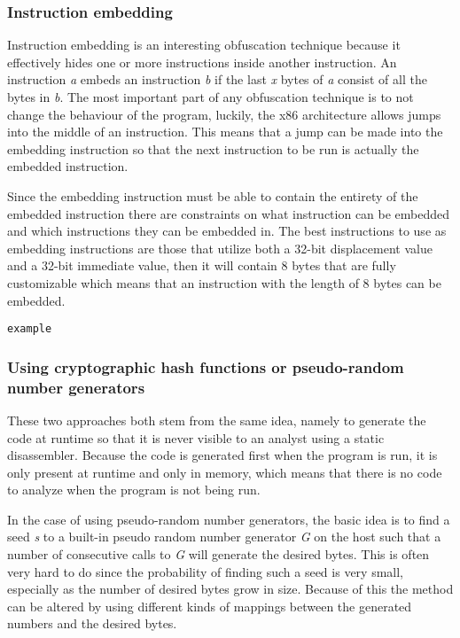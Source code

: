 \documentclass[11pt,twoside]{eitExjobb}
\begin{document}
\subsubsection{Instruction embedding}
Instruction embedding\cite{instructionembedding} is an interesting obfuscation technique because it effectively hides one or more instructions inside another instruction. An instruction \emph{a} embeds an instruction \emph{b} if the last \emph{x} bytes of \emph{a} consist of all the bytes in \emph{b}. The most important part of any obfuscation technique is to not change the behaviour of the program, luckily, the x86 architecture allows jumps into the middle of an instruction. This means that a jump can be made into the embedding instruction so that the next instruction to be run is actually the embedded instruction.

Since the embedding instruction must be able to contain the entirety of the embedded instruction there are constraints on what instruction can be embedded and which instructions they can be embedded in. The best instructions to use as embedding instructions are those that utilize both a 32-bit displacement value and a 32-bit immediate value, then it will contain 8 bytes that are fully customizable which means that an instruction with the length of 8 bytes can be embedded.

\begin{verbatim}
example
\end{verbatim}



\subsubsection{Using cryptographic hash functions or pseudo-random number generators}
These two approaches both stem from the same idea, namely to generate the code at runtime so that it is never visible to an analyst using a static disassembler. Because the code is generated first when the program is run, it is only present at runtime and only in memory, which means that there is no code to analyze when the program is not being run.

In the case of using pseudo-random number generators, the basic idea is to find a seed \emph{s} to a built-in pseudo random number generator \emph{G} on the host such that a number of consecutive calls to \emph{G} will generate the desired bytes. This is often very hard to do since the probability of finding such a seed is very small, especially as the number of desired bytes grow in size. Because of this the method can be altered by using different kinds of mappings between the generated numbers and the desired bytes.\cite{prng}
\end{document}
